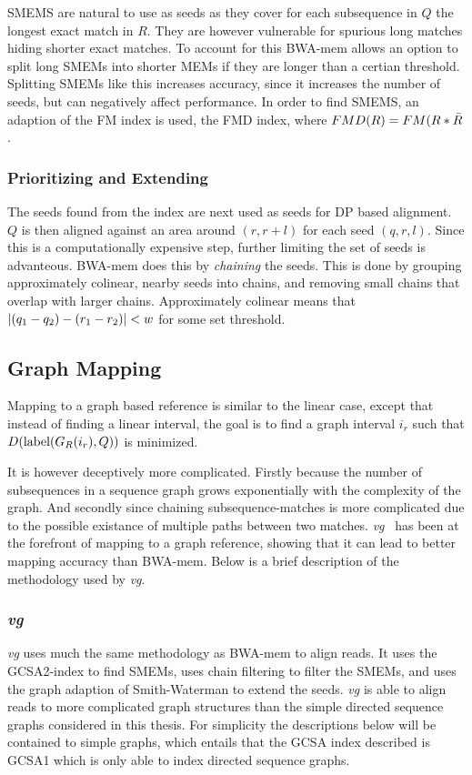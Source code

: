 SMEMS are natural to use as seeds as they cover for each subsequence in $Q$ the longest exact match in $R$.
They are however vulnerable for spurious long matches hiding shorter exact matches.
To account for this BWA-mem allows an option to split long SMEMs into shorter MEMs if they are longer than a certian threshold.
Splitting SMEMs like this increases accuracy, since it increases the number of seeds, but can negatively affect performance. 
In order to find SMEMS, an adaption of the FM index is used, the FMD index, where $FMD(R) = FM(R * \bar{R}$.

\subsubsection{Prioritizing and Extending}
The seeds found from the index are next used as seeds for DP based alignment.
$Q$ is then aligned against an area around $(r, r+l)$ for each seed $(q, r, l)$.
Since this is a computationally expensive step, further limiting the set of seeds is advanteous.
BWA-mem does this by \emph{chaining} the seeds.
This is done by grouping approximately colinear, nearby seeds into chains, and removing small chains that overlap with larger chains.
Approximately colinear means that $\left | (q_1-q_2) -(r_1-r_2) \right |<w$ for some set threshold.

\subsection{Graph Mapping}
Mapping to a graph based reference is similar to the linear case, except that instead of finding a linear interval, the goal is to find a graph interval $i_r$ such that $D(\text{label}(G_R(i_r), Q))$ is minimized. 

It is however deceptively more complicated. 
Firstly because the number of subsequences in a sequence graph grows exponentially with the complexity of the graph. 
And secondly since chaining subsequence-matches is more complicated due to the possible existance of multiple paths between two matches.
\emph{vg}~\cite{vg} has been at the forefront of mapping to a graph reference, showing that it can lead to better mapping accuracy than BWA-mem. 
Below is a brief description of the methodology used by \emph{vg}.

\subsubsection{\emph{vg}}
\emph{vg} uses much the same methodology as BWA-mem to align reads.
It uses the GCSA2-index to find SMEMs, uses chain filtering to filter the SMEMs, and uses the graph adaption of Smith-Waterman to extend the seeds.
\emph{vg} is able to align reads to more complicated graph structures than the simple directed sequence graphs considered in this thesis.
For simplicity the descriptions below will be contained to simple graphs, which entails that the GCSA index described is GCSA1\cite{gcsa1} which is only able to index directed sequence graphs.

